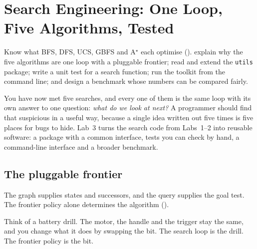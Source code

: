 \chapter{Search Engineering: One Loop, Five Algorithms, Tested}
\label{ch:searchpatterns}

\chapterguide%
  {Know what BFS, DFS, UCS, GBFS and A$^\star$ each optimise ().}
  {explain why the five algorithms are one loop with a pluggable frontier; read and extend the \texttt{utils} package; write a unit test for a search function; run the toolkit from the command line; and design a benchmark whose numbers can be compared fairly.}

You have now met five searches, and every one of them is the same loop with its own answer to one question: \emph{what do we look at next?} A programmer should find that suspicious in a useful way, because a single idea written out five times is five places for bugs to hide. Lab~3 turns the search code from Labs~1--2 into reusable software: a package with a common interface, tests you can check by hand, a command-line interface and a broader benchmark.

\section{The pluggable frontier}

The graph supplies states and successors, and the query supplies the goal test. The frontier policy alone determines the algorithm ().

\begin{analogy}
Think of a battery drill. The motor, the handle and the trigger stay the same, and you change what it does by swapping the bit. The search loop is the drill. The frontier policy is the bit.
\end{analogy}

